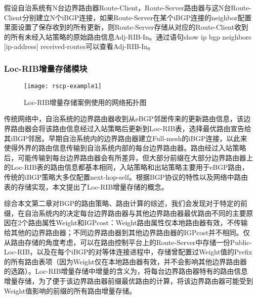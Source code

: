 假设自治系统有N台边界路由器Route-Client，Route-Server路由器与这N台Route-Client分别建立N个iBGP连接，如果Route-Server在某个iBGP连接的neighbor配置里面设置了保存收到的所有更新，则Route-Server存储从对应的Route-Client收到的所有未经入站策略的原始路由信息Adj-RIB-In。通过语句show ip bgp neighbors [ip-address] received-routes可以查看Adj-RIB-In。


\subsubsection{Loc-RIB增量存储模块}

\begin{figure}
  \centering
  \texttt{[image: rscp-example1]}
  \caption{Loc-RIB增量存储案例使用的网络拓扑图}
  \label{fig:rscp-example1}
\end{figure}

传统网络中，自治系统的边界路由器收到从eBGP邻居传来的更新路由信息，该边界路由器会将该路由信息经过入站策略后更新到Loc-RIB表，选择最优路由宣告给其iBGP邻居。早期自治系统内的边界路由器建立Full-mesh的iBGP连接，以此来使得外界的路由信息传输到自治系统内部的每台边界路由器。路由经过入站策略后，可能传输到每台边界路由器会有所差异，但大部分前缀在大部分边界路由器上的Loc-RIB表的路由信息都基本相同，入站策略和出站策略主要用于eBGP路由，传统的iBGP策略大多仅配置next-hop-self。根据BGP协议的特性以及网络中路由表的存储实现，本文提出了Loc-RIB增量存储的概念。

综合本文第二章对BGP的路由策略、路由计算的综述，我们会发现对于特定的前缀，在自治系统内的决定每台边界路由器与其他边界路由器最优路由不同的主要原因在2个路由属性Weight和IGPcost：Weight路由属性仅本地路由器有效，不传输给其他的边界路由器；不同边界路由器到其他边界路由器的IGPcost并不相同。仅从路由存储的角度考虑，可以在路由控制平台上的Route-Server中存储一份Public-Loc-RIB，以及在每个iBGP的对等体连接进程中，存储曾配置过Weight值的Prefix的所有路由表项（因为Weight仅在本地路由器有效，并不会影响其他边界路由器的选路）。Loc-RIB增量存储中增量的含义为，将每台边界路由器特有的路由信息增量存储，为了便于该边界路由器前缀最优路由的计算，将该边界路由器可能受到Weight值影响的前缀的所有路由增量存储。



